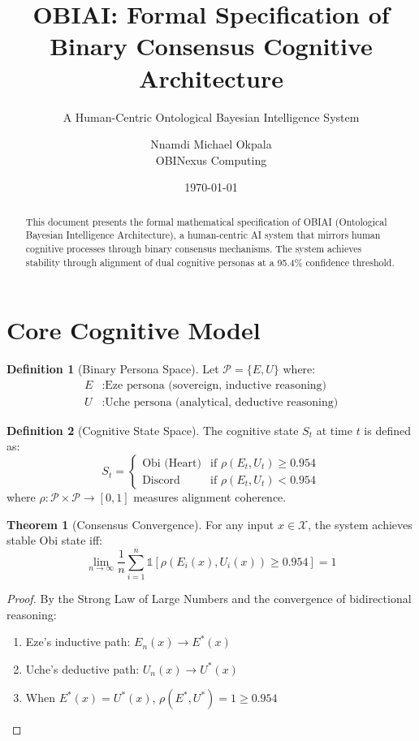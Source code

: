 \documentclass[11pt]{article}
\title{OBIAI: Formal Specification of Binary Consensus Cognitive Architecture}
\subtitle{A Human-Centric Ontological Bayesian Intelligence System}
\author{Nnamdi Michael Okpala\\OBINexus Computing}
\date{\today}
\theoremstyle{definition}
\newtheorem{definition}{Definition}
\newtheorem{theorem}{Theorem}
\begin{document}
\maketitle

\begin{abstract}
This document presents the formal mathematical specification of OBIAI (Ontological Bayesian Intelligence Architecture), a human-centric AI system that mirrors human cognitive processes through binary consensus mechanisms. The system achieves stability through alignment of dual cognitive personas at a 95.4\% confidence threshold.
\end{abstract}

\section{Core Cognitive Model}

\begin{definition}[Binary Persona Space]
Let $\mathcal{P} = \{E, U\}$ where:
\begin{align}
E &: \text{Eze persona (sovereign, inductive reasoning)} \\
U &: \text{Uche persona (analytical, deductive reasoning)}
\end{align}
\end{definition}

\begin{definition}[Cognitive State Space]
The cognitive state $S_t$ at time $t$ is defined as:
\[
S_t = \begin{cases}
\text{Obi (Heart)} & \text{if } \rho(E_t, U_t) \geq 0.954 \\
\text{Discord} & \text{if } \rho(E_t, U_t) < 0.954
\end{cases}
\]
where $\rho: \mathcal{P} \times \mathcal{P} \to [0,1]$ measures alignment coherence.
\end{definition}

\begin{theorem}[Consensus Convergence]
For any input $x \in \mathcal{X}$, the system achieves stable Obi state iff:
\[
\lim_{n \to \infty} \frac{1}{n} \sum_{i=1}^{n} \mathbb{1}[\rho(E_i(x), U_i(x)) \geq 0.954] = 1
\]
\end{theorem}

\begin{proof}
By the Strong Law of Large Numbers and the convergence of bidirectional reasoning:
\begin{enumerate}
\item Eze's inductive path: $E_n(x) \to E^*(x)$ 
\item Uche's deductive path: $U_n(x) \to U^*(x)$
\item When $E^*(x) = U^*(x)$, $\rho(E^*, U^*) = 1 \geq 0.954$
\end{enumerate}
\end{proof}
\end{document}
